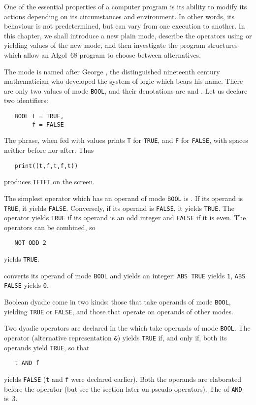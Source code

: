 %
One of the essential properties of a computer program is its ability
to modify its actions depending on its circumstances and environment.
In other words, its behaviour is not predetermined, but can vary from
one execution to another. In this chapter, we shall introduce a new
plain mode, describe the operators using or yielding values of the
new mode, and then investigate the program structures which allow an
Algol~68 program to choose between alternatives.

\pagebreak
{}
 The mode  is named after George
, the distinguished nineteenth century
mathematician who developed the system of logic which bears his name.
There are only two values of mode \verb|BOOL|, and their denotations
are  and .  Let us declare two identifiers:
\begin{verbatim}
   BOOL t = TRUE,
        f = FALSE
\end{verbatim}
\noindent
The  phrase, when fed with  values prints
\verb|T| for \verb|TRUE|, and \verb|F| for \verb|FALSE|, with spaces
neither before nor after. Thus
\begin{verbatim}
   print((t,f,t,f,t))
\end{verbatim}
\noindent
produces \verb|TFTFT| on the screen.

The simplest operator which has an operand of mode \verb|BOOL| is
. If its operand is \verb|TRUE|, it yields \verb|FALSE|.
Conversely, if its operand is \verb|FALSE|, it yields \verb|TRUE|.
The operator  yields \verb|TRUE| if its operand is an odd
integer and \verb|FALSE| if it is even. The operators can be
combined, so
\begin{verbatim}
   NOT ODD 2
\end{verbatim}
\noindent
yields \verb|TRUE|.

 converts its operand of mode \verb|BOOL| and yields an
integer: \verb|ABS TRUE| yields \verb|1|, \verb|ABS FALSE| yields
\verb|0|.

Boolean dyadic  come in two
kinds: those that take operands of mode \verb|BOOL|, yielding
\verb|TRUE| or \verb|FALSE|, and those that operate on operands of
other modes.

Two dyadic operators are declared in the  which
take operands of mode \verb|BOOL|. The operator 
(alternative representation \verb|&|) yields \verb|TRUE| if,
and only if, both its operands yield \verb|TRUE|, so that
\begin{verbatim}
   t AND f
\end{verbatim}
\noindent
yields \verb|FALSE| (\verb|t| and \verb|f| were declared earlier).
Both the operands are elaborated before the operator (but see the
section later on pseudo-operators).  The  of \verb|AND|
is~3.

